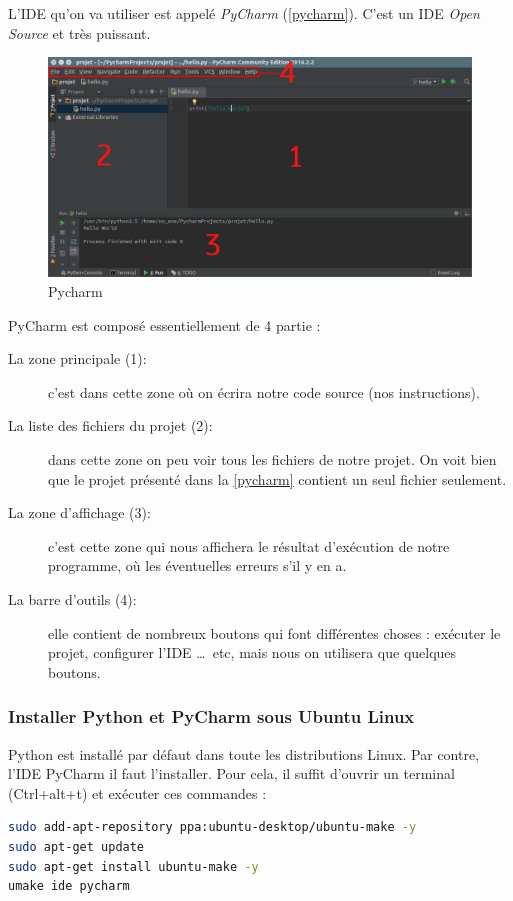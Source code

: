 \documentclass[12pt]{article}
\begin{document}
        L'IDE qu'on va utiliser est appelé \emph{PyCharm} (\autoref{pycharm}). C'est un IDE \emph{Open Source} et très
        puissant.

        \begin{figure}[H]
            \centering
            \includegraphics[width=\linewidth]{img/8_pycharm.png}
            \caption{Pycharm}
            \label{pycharm}
        \end{figure}

        PyCharm est composé essentiellement de 4 partie :
        \begin{description}
            \item[La zone principale (1):] c'est dans cette zone où on écrira notre code source (nos instructions).
            \item[La liste des fichiers du projet (2):] dans cette zone on peu voir tous les fichiers de notre projet.
                On voit bien que le projet présenté dans la \autoref{pycharm} contient un seul fichier seulement.
            \item[La zone d'affichage (3):] c'est cette zone qui nous affichera le résultat d'exécution de notre
                programme, où les éventuelles erreurs s'il y en a.
            \item[La barre d'outils (4):] elle contient de nombreux boutons qui font différentes choses : exécuter
            le projet, configurer l'IDE \ldots\ etc, mais nous on utilisera que quelques boutons.
        \end{description}

        \subsubsection{Installer Python et PyCharm sous Ubuntu Linux}
            Python est installé par défaut dans toute les distributions Linux. Par contre, l'IDE PyCharm il
            faut l'installer. Pour cela, il suffit d'ouvrir un terminal (Ctrl+alt+t) et exécuter ces commandes :
            \begin{lstlisting}[language=bash, style=code, numbers=none]
sudo add-apt-repository ppa:ubuntu-desktop/ubuntu-make -y
sudo apt-get update
sudo apt-get install ubuntu-make -y
umake ide pycharm
            \end{lstlisting}
\end{document}
